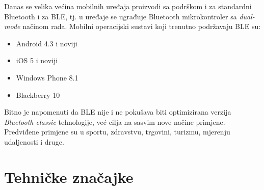 Danas se velika većina mobilnih uređaja proizvodi sa podrškom i za standardni Bluetooth i za BLE, tj. u uređaje se ugrađuje Bluetooth mikrokontroler sa \textit{dual-mode} načinom rada. 
Mobilni operacijski sustavi koji trenutno podržavaju BLE su:

\begin{itemize}
    \item Android 4.3 i noviji
    \item iOS 5 i noviji
    \item Windows Phone 8.1
    \item Blackberry 10
\end{itemize}
Bitno je napomenuti da BLE nije i ne pokušava biti optimizirana verzija \textit{Bluetooth classic} tehnologije, već cilja na sasvim nove načine primjene. 
Predviđene primjene su u sportu, zdravstvu, trgovini, turizmu, mjerenju udaljenosti i druge.


\section*{Tehničke značajke}

